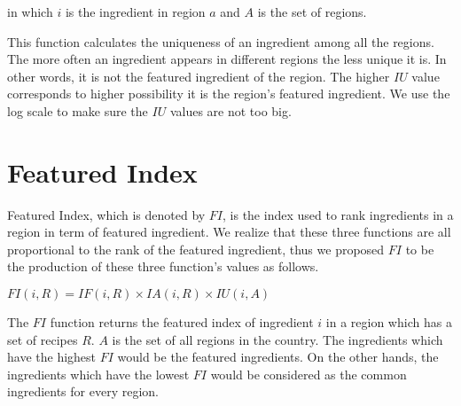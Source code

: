 in which $i$ is the ingredient in region $a$ and $A$ is the set of regions.

This function calculates the uniqueness of an ingredient among all the regions. The more often an ingredient appears in different regions the less unique it is. In other words, it is not the featured ingredient of the region. The higher $IU$ value corresponds to higher possibility it is the region's featured ingredient. We use the log scale to make sure the $IU$ values are not too big.

\section{Featured Index}

Featured Index, which is denoted by $FI$, is the index used to rank ingredients in a region in term of featured ingredient. We realize that these three functions are all proportional to the rank of the featured ingredient, thus we proposed $FI$ to be the production of these three function's values as follows.
\begin{center}
\smallskip
$FI(i,R)= IF(i,R) \times IA(i,R) \times IU(i,A)$ 
\smallskip
\end{center}

The $FI$ function returns the featured index of ingredient $i$ in a region which has a set of recipes $R$. $A$ is the set of all regions in the country. The ingredients which have the highest $FI$ would be the featured ingredients. On the other hands, the ingredients which have the lowest $FI$ would be considered as the common ingredients for every region.